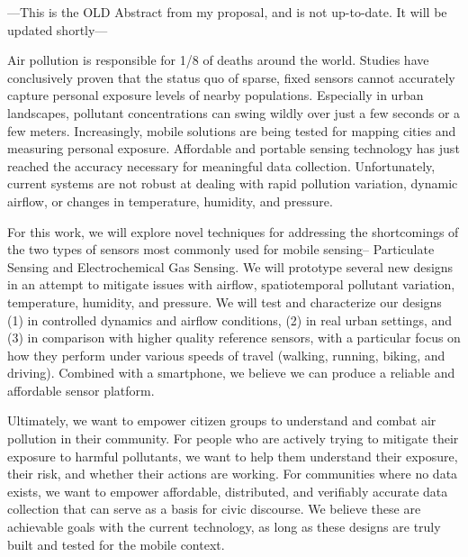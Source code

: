 % 
% 
%


---This is the OLD Abstract from my proposal, and is not up-to-date.  It will be updated shortly---

Air pollution is responsible for 1/8 of deaths around the world.  Studies have conclusively proven that the status quo of sparse, fixed sensors cannot accurately capture personal exposure levels of nearby populations.  Especially in urban landscapes, pollutant concentrations can swing wildly over just a few seconds or a few meters.  
Increasingly, mobile solutions are being tested for mapping cities and measuring personal exposure.  Affordable and portable sensing technology has just reached the accuracy necessary for meaningful data collection.  Unfortunately, current systems are not robust at dealing with rapid pollution variation, dynamic airflow, or changes in temperature, humidity, and pressure.

For this work, we will explore novel techniques for addressing the shortcomings of the two types of sensors most commonly used for mobile sensing-- Particulate Sensing and Electrochemical Gas Sensing.  We will prototype several new designs in an attempt to mitigate issues with airflow, spatiotemporal pollutant variation, temperature, humidity, and pressure. We will test and characterize our designs (1) in controlled dynamics and airflow conditions, (2) in real urban settings, and (3) in comparison with higher quality reference sensors, with a particular focus on how they perform under various speeds of travel (walking, running, biking, and driving). Combined with a smartphone, we believe we can produce a reliable and affordable sensor platform.

Ultimately, we want to empower citizen groups to understand and combat air pollution in their community.  For people who are actively trying to mitigate their exposure to harmful pollutants, we want to help them understand their exposure, their risk, and whether their actions are working.  For communities where no data exists, we want to empower affordable, distributed, and verifiably accurate data collection that can serve as a basis for civic discourse.  We believe these are achievable goals with the current technology, as long as these designs are truly built and tested for the mobile context.
